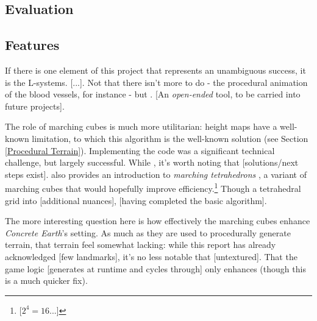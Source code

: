 \documentclass[a4paper, 11pt]{article}
\begin{document}
\begin{flushleft}

\section{Evaluation}\label{Evaluation}

\subsection{Features}

If there is one element of this project that represents an unambiguous success, it is the L-systems. [...]. Not that there isn't more to do - the procedural animation of the blood vessels, for instance - but . [An \textit{open-ended} tool, to be carried into future projects].

\vspace{5pt}\noindent
The role of marching cubes is much more utilitarian: height maps have a well-known limitation, to which this algorithm is the well-known solution (see Section \ref{Procedural Terrain}). Implementing the code was a significant technical challenge, but largely successful. While , it's worth noting that [solutions/next steps exist]. \citeauthor{bourkeMarchingTetrahedrons} also provides an introduction to \textit{marching tetrahedrons} \citeyearpar{bourkeMarchingTetrahedrons}, a variant of marching cubes that would hopefully improve efficiency.\footnote{[$2^4 = 16$...]} %
Though a  tetrahedral grid into  [additional nuances], [having completed the basic algorithm]. %

\vspace{5pt}\noindent
The more interesting question here is how effectively the marching cubes enhance \textit{Concrete Earth}'s setting. As much as they are used to procedurally generate terrain, that terrain feel somewhat lacking: while this report has already acknowledged [few landmarks], it's no less notable that [untextured]. That the game logic [generates at runtime and cycles through] only enhances (though this is a much quicker fix).


\end{flushleft}
\end{document}
